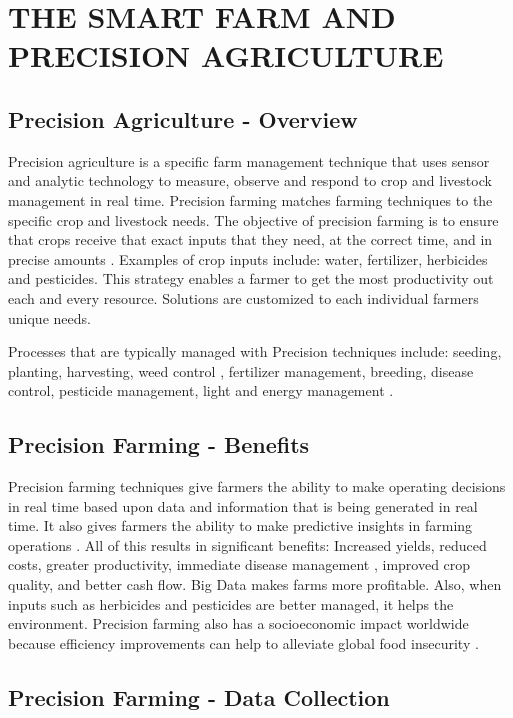 \documentclass[sigconf]{acmart}
\begin{document}
\section{THE SMART FARM AND PRECISION AGRICULTURE}

\subsection{Precision Agriculture - Overview}

Precision agriculture is a specific farm management technique that uses sensor and analytic technology to measure, observe and respond to crop and livestock management in real time.  Precision farming matches farming techniques to the specific crop and livestock needs.  The objective of precision farming is to ensure that crops receive that exact inputs that they need, at the correct time, and in precise amounts \cite{www-google-Wikipedia}. Examples of crop inputs include: water, fertilizer, herbicides and pesticides.  This strategy enables a farmer to get the most productivity out each and every resource. Solutions are customized to each individual farmers unique needs.

Processes that are typically managed with Precision techniques include: seeding, planting, harvesting, weed control \cite{www-google-Digital}, fertilizer management, breeding, disease control, pesticide management, light and energy management \cite{Wolfert}. 

\subsection {Precision Farming - Benefits}

Precision farming techniques give farmers the ability to make operating decisions in real time based upon data and information that is being generated in real time.  It also gives farmers the ability to make predictive insights in farming operations \cite{Wolfert}.  All of this results in significant benefits: Increased yields, reduced costs, greater productivity, immediate disease management \cite{www-google-Crop}, improved crop quality, and better cash flow.  Big Data makes farms more profitable. Also, when inputs such as herbicides and pesticides are better managed, it helps the environment. Precision farming also has a socioeconomic impact worldwide because efficiency improvements can help to alleviate global food insecurity \cite{Wolfert}.

\subsection{Precision Farming - Data Collection}
\end{document}
